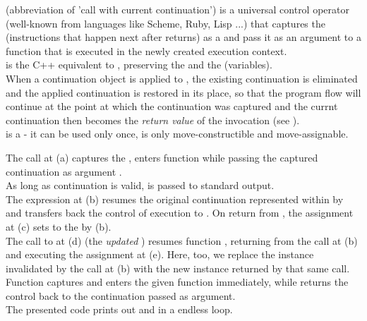 
\cc (abbreviation of 'call with current continuation') is a universal control
operator (well-known from languages like Scheme, Ruby, Lisp ...) that captures
the \currcont (instructions that happen next after \cc returns) as a
 and pass it as an argument to a function that is
executed in the newly created execution context.\\

\call is the C++ equivalent to \cc, preserving the  and the
 (variables).\\

When a continuation object is applied to \resume, the existing continuation is
eliminated and the applied continuation is restored in its place, so that the
program flow will continue at the point at which the continuation was captured
and the currnt continuation then becomes the \emph{return value} of the \call
invocation (see ).\\

\cont is a  - it can be used only once, is only
move-constructible and move-assignable.

The  call at (a) captures the \currcont, enters function
 while passing the captured continuation as argument .\\
As long as continuation  is valid,  is passed to standard
output.\\
The expression  at (b) resumes the original
continuation represented within  by  and transfers back the
control of execution to . On return from ,
the assignment at (c) sets  to the \currcont by (b).\\
The call to  at (d) (the \emph{updated} )
resumes function , returning from the  call at (b) and
executing the assignment at (e). Here, too, we replace the \cont instance
 invalidated by the \resume call at (b) with the new instance
returned by that same \resume call.\\
Function \call captures \currcont and enters the given function immediately,
while \resume returns the control back to the continuation passed as argument.\\
The presented code prints out  and  in a endless loop.\\

